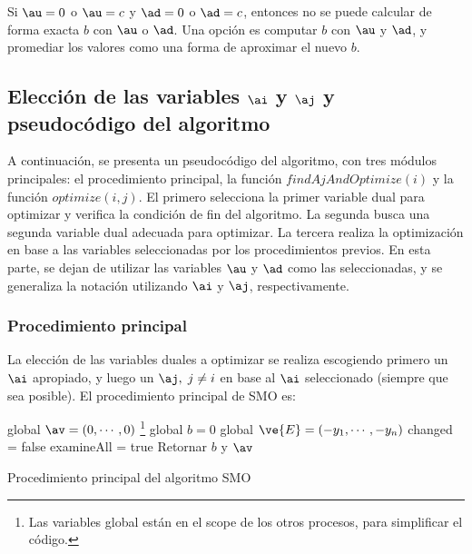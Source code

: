 Si $\au=0$ o $\au=c$ y $\ad = 0$ o $\ad = c$, entonces no se puede calcular de forma exacta $b$ con $\au$ o $\ad$. Una opción es computar $b$ con $\au$ y $\ad$, y promediar los valores como una forma de aproximar el nuevo $b$. 

\subsection{Elección de las variables $\ai$ y $\aj$ y pseudocódigo del algoritmo}

A continuación, se presenta un pseudocódigo del algoritmo, con tres módulos principales: el procedimiento principal, la función $findAjAndOptimize(i)$ y la función $optimize(i,j)$. El primero selecciona la primer variable dual para optimizar y verifica la condición de fin del algoritmo. La segunda busca una segunda variable dual adecuada para optimizar. La tercera realiza la optimización en base a las variables seleccionadas por los procedimientos previos. En esta parte, se dejan de utilizar las variables $\au$ y $\ad$ como las seleccionadas, y se generaliza la notación utilizando $\ai$ y $\aj$, respectivamente.

\subsubsection{Procedimiento principal}

La elección de las variables duales a optimizar se realiza escogiendo primero un $\ai$ apropiado, y luego un $\aj, \; j \neq i$ en base al $\ai$ seleccionado (siempre que sea posible). El procedimiento principal de SMO es:

\begin{algorithm}[H]
global $\av=(0,\cdots,0)$ \footnote{Las variables global están en el scope de los otros procesos, para simplificar el código.}\;
global $b=0$ \;
global $\ve{E}=(-y_1,\cdots,-y_n)$ \;
changed = false \;
examineAll = true \;
Retornar  $b$ y $\av$ \;
\caption{Procedimiento principal del algoritmo SMO} 
\end{algorithm}
\vspace{10pt}


